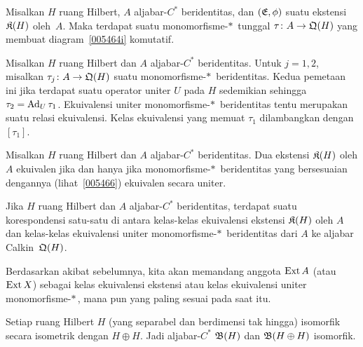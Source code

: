 \begin{prop}\label{005466} Misalkan $H$ ruang Hilbert, $A$ aljabar-$C^*$ beridentitas, dan
$(\mathfrak{E},\phi)$ suatu ekstensi $\mathfrak{K}(H)$ oleh~$A$. Maka terdapat suatu
monomorfisme-$*\,$ tunggal $\tau \colon A \rightarrow \mathfrak{Q}(H)$ yang membuat
diagram~\eqref{005464i} komutatif.
\end{prop}

\begin{defn} Misalkan $H$ ruang Hilbert dan $A$ aljabar-$C^*$ beridentitas. Untuk $j=1,2$, misalkan
$\tau_j\colon A \rightarrow \mathfrak{Q}(H)$ suatu monomorfisme-$*\,$ beridentitas. Kedua pemetaan ini
 jika terdapat suatu operator uniter $U$ pada $H$ sedemikian sehingga $\tau_2 =
\operatorname{Ad}_U \tau_1$. Ekuivalensi uniter monomorfisme-$*\,$ beridentitas tentu merupakan suatu
relasi ekuivalensi. Kelas ekuivalensi yang memuat $\tau_1$ dilambangkan
dengan~$[\tau_1]$.
\end{defn}

\begin{prop} Misalkan $H$ ruang Hilbert dan $A$ aljabar-$C^*$ beridentitas. Dua ekstensi
$\mathfrak{K}(H)$ oleh $A$ ekuivalen jika dan hanya jika monomorfisme-$*\,$ beridentitas yang
bersesuaian dengannya (lihat~\ref{005466}) ekuivalen secara uniter.
\end{prop}

\begin{cor} Jika $H$ ruang Hilbert dan $A$ aljabar-$C^*$ beridentitas, terdapat suatu korespondensi
satu-satu di antara kelas-kelas ekuivalensi ekstensi $\mathfrak{K}(H)$ oleh $A$ dan
kelas-kelas ekuivalensi uniter monomorfisme-$*\,$ beridentitas dari $A$ ke aljabar
Calkin~$\mathfrak{Q}(H)$.
\end{cor}

\begin{conv} Berdasarkan akibat sebelumnya, kita akan memandang anggota $\operatorname{Ext} A$ (atau
$\operatorname{Ext} X$) sebagai
kelas ekuivalensi ekstensi atau kelas ekuivalensi uniter monomorfisme-$*\,$,
mana pun yang paling sesuai pada saat itu.
\end{conv}

\begin{prop}\label{0054702} Setiap ruang Hilbert $H$ (yang separabel dan berdimensi tak hingga)
isomorfik secara isometrik dengan $H \oplus H$. Jadi aljabar-$C^*$ $\mathfrak{B}(H)$ dan $\mathfrak{B}(H \oplus H)$ isomorfik.
\end{prop}

